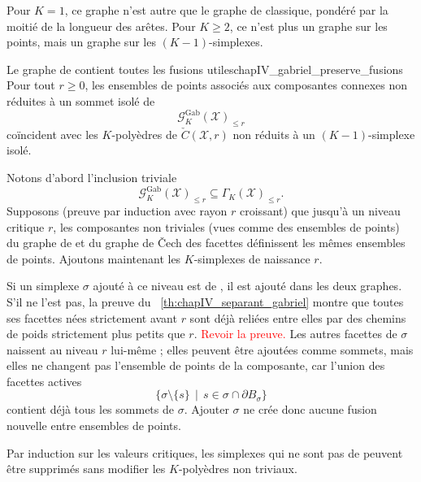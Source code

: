 Pour $K=1$, ce graphe n'est autre que le graphe de  classique, pondéré par la moitié de la longueur des arêtes. Pour $K\ge2$, ce n'est plus un graphe sur les points, mais un graphe sur les $(K-1)$-simplexes. %

\begin{Fait}{Le graphe de  contient toutes les fusions utiles}{chapIV_gabriel_preserve_fusions}
Pour tout $r\ge0$, les ensembles de points associés aux composantes connexes non réduites à un sommet isolé de
\[
    \mathcal G_K^{\mathrm{Gab}}(\mathcal X)_{\le r}
\]
coïncident avec les $K$-polyèdres de $\check C(\mathcal X,r)$ non réduits à un $(K-1)$-simplexe isolé.
\end{Fait}

\begin{Preuve}
Notons d'abord l'inclusion triviale
\[
    \mathcal G_K^{\mathrm{Gab}}(\mathcal X)_{\le r}
    \subseteq
    \Gamma_K(\mathcal X)_{\le r}.
\]
Supposons (preuve par induction avec rayon $r$ croissant) que jusqu'à un niveau critique $r$, les composantes non triviales (vues comme des ensembles de points) du graphe de  et du graphe de \v Cech des facettes définissent les mêmes ensembles de points. Ajoutons maintenant les $K$-simplexes de naissance $r$.

Si un simplexe $\sigma$ ajouté à ce niveau est de , il est ajouté dans les deux graphes. S'il ne l'est pas, la preuve du \Th~\ref{th:chapIV_separant_gabriel} montre que toutes ses facettes nées strictement avant $r$ sont déjà reliées entre elles par des chemins de poids strictement plus petits que $r$. \textcolor{red}{Revoir la preuve.} Les autres facettes de $\sigma$ naissent au niveau $r$ lui-même ; elles peuvent être ajoutées comme sommets, mais elles ne changent pas l'ensemble de points de la composante, car l'union des facettes actives
\[
    \{\sigma\setminus\{s\}\, \mid \, s\in\sigma\cap\partial B_\sigma\}
\]
contient déjà tous les sommets de $\sigma$. Ajouter $\sigma$ ne crée donc aucune fusion nouvelle entre ensembles de points.

Par induction sur les valeurs critiques, les simplexes qui ne sont pas de  peuvent être supprimés sans modifier les $K$-polyèdres non triviaux.
\end{Preuve}

